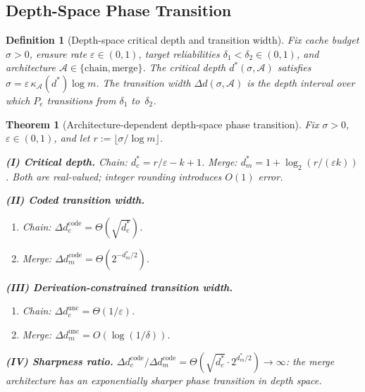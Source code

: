 \documentclass[journal]{IEEEtran}
\newtheorem{theorem}{Theorem}[section]
\newtheorem{definition}{Definition}[section]
\numberwithin{equation}{section}
\begin{document}
\subsection{Depth-Space Phase Transition}
\label{subsec:depth-phase}

\begin{definition}[Depth-space critical depth and transition
  width]
\label{def:depth-space-trans}
Fix cache budget $\sigma>0$, erasure rate
$\varepsilon\in(0,1)$, target reliabilities
$\delta_1<\delta_2\in(0,1)$, and architecture
$\mathcal A\in\{\mathrm{chain},\mathrm{merge}\}$.
The \emph{critical depth} $d^*(\sigma,\mathcal A)$ satisfies
$\sigma=\varepsilon\,\kappa_{\mathcal A}(d^*)\log m$.
The \emph{transition width}
$\Delta d(\sigma,\mathcal A)$ is the depth interval over
which $P_e$ transitions from $\delta_1$ to~$\delta_2$.
\end{definition}

\begin{theorem}[Architecture-dependent depth-space phase
  transition]
\label{thm:arch-phase-ds}
Fix $\sigma>0$, $\varepsilon\in(0,1)$, and let
$r:=\lfloor\sigma/\log m\rfloor$.

\smallskip\noindent
\textbf{\upshape(I) Critical depth.}
Chain: $d^*_c=r/\varepsilon-k+1$.
Merge: $d^*_m=1+\log_2(r/(\varepsilon k))$.
Both are real-valued; integer rounding introduces $O(1)$ error.

\smallskip\noindent
\textbf{\upshape(II) Coded transition width.}
\begin{enumerate}[label=\textup{(\alph*)}]
\item Chain:
$\Delta d_c^{\mathrm{code}}
=\Theta(\sqrt{d^*_c})$.
\item Merge:
$\Delta d_m^{\mathrm{code}}
=\Theta(2^{-d^*_m/2})$.
\end{enumerate}

\smallskip\noindent
\textbf{\upshape(III) Derivation-constrained transition
  width.}
\begin{enumerate}[label=\textup{(\alph*)}]
\item Chain:
$\Delta d_c^{\mathrm{unc}}=\Theta(1/\varepsilon)$.
\item Merge:
$\Delta d_m^{\mathrm{unc}}
=O(\log(1/\delta))$.
\end{enumerate}

\smallskip\noindent
\textbf{\upshape(IV) Sharpness ratio.}
$\Delta d_c^{\mathrm{code}}
/\Delta d_m^{\mathrm{code}}
=\Theta(\sqrt{d^*_c}\cdot 2^{d^*_m/2})
\to\infty$:
the merge architecture has an exponentially sharper
phase transition in depth space.
\end{theorem}
\end{document}
